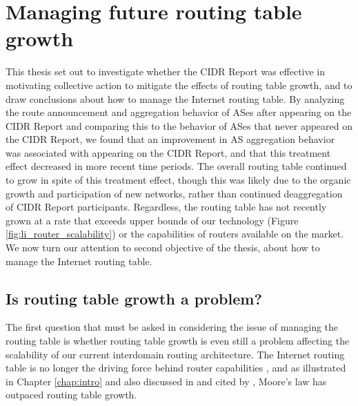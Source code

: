 \chapter{Managing future routing table growth}
\label{chap:conclusion}

This thesis set out to investigate whether the CIDR Report was effective in
motivating collective action to mitigate the effects of routing table growth,
and to draw conclusions about how to manage the Internet routing table. By
analyzing the route announcement and aggregation behavior of ASes after
appearing on the CIDR Report and comparing this to the behavior of ASes that
never appeared on the CIDR Report, we found that an improvement in AS
aggregation behavior was associated with appearing on the CIDR Report, and that
this treatment effect decreased in more recent time periods. The overall
routing table continued to grow in spite of this treatment effect, though this
was likely due to the organic growth and participation of new networks, rather
than continued deaggregation of CIDR Report participants. Regardless, the
routing table has not recently grown at a rate that exceeds upper bounds of our
technology (Figure \ref{fig:li_router_scalability}) or the capabilities of
routers available on the market. We now turn our attention to second objective
of the thesis, about how to manage the Internet routing table.


\section{Is routing table growth a problem?}
The first question that must be asked in considering the issue of managing the
routing table is whether routing table growth is even still a problem affecting
the scalability of our current interdomain routing architecture. The Internet
routing table is no longer the driving force behind router capabilities
\cite{Davie:2011uq}, and as illustrated in Chapter \ref{chap:intro} and also
discussed in \cite{Fall:2009fk} and cited by \cite{Huston:2011ys}, Moore's law
has outpaced routing table growth.

